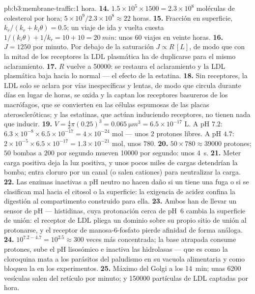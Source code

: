 \begin{solution}{pb:b3:membrane-traffic:1}
hora.
\textbf{14.} $1.5\times 10^{5}\times 1500 = 2.3\times 10^{8}$ moléculas
de colesterol por hora; $5\times 10^{9}/2.3\times 10^{8} \approx 22$
horas.
\textbf{15.} Fracción en superficie, $k_{r}/(k_{r} + k_{i}\theta) = 0.5$;
un viaje de ida y vuelta cuesta
$1/(k_{i}\theta) + 1/k_{r} = 10 + 10 = \qty{20}{min}$: unos $60$ viajes
en veinte horas.
\textbf{16.} $J = 1250$ por minuto. Por debajo de la saturación
$J \propto R\,[L]$, de modo que con la mitad de los receptores la LDL
plasmática ha de duplicarse para el mismo aclaramiento.
\textbf{17.} $R$ vuelve a \num{50000}: se restaura el aclaramiento y la
LDL plasmática baja hacia lo normal --- el efecto de la estatina.
\textbf{18.} Sin receptores, la LDL solo se aclara por vías inespecíficas
y lentas, de modo que circula durante días en lugar de horas, se oxida y
la captan los receptores basureros de los macrófagos, que se convierten
en las células espumosas de las placas ateroscleróticas; y las estatinas,
que actúan induciendo receptores, no tienen nada que inducir.
\textbf{19.} $V = \tfrac{4}{3}\pi(0.25)^{3} = \qty{0.065}{\micro m^3} =
6.5\times 10^{-17}$ L. A pH $7.2$: $6.3\times 10^{-8}\times 6.5\times
10^{-17} = 4\times 10^{-24}$ mol --- unos $2$ protones libres. A pH
$4.7$: $2\times 10^{-5}\times 6.5\times 10^{-17} = 1.3\times 10^{-21}$
mol, unos $780$.
\textbf{20.} $50\times 780 \approx \num{39000}$ protones; $50$ bombas a
$200$ por segundo mueven \num{10000} por segundo: unos \qty{4}{s}.
\textbf{21.} Meter carga positiva deja la luz positiva, y unos pocos
miles de cargas detendrían la bomba; entra cloruro por un canal (o salen
cationes) para neutralizar la carga.
\textbf{22.} Las enzimas inactivas a pH neutro no hacen daño si un
 tiene una fuga o si se clasifican mal hacia el citosol o la
superficie: la exigencia de acidez confina la digestión al compartimento
construido para ella.
\textbf{23.} Ambos han de llevar un sensor de pH --- histidinas, cuya
protonación cerca de pH~6 cambia la superficie de unión: el receptor de
LDL pliega un dominio sobre su propio sitio de unión al protonarse, y el
receptor de manosa-6-fosfato pierde afinidad de forma análoga.
\textbf{24.} $10^{7.2 - 4.7} = 10^{2.5} \approx 300$ veces más
concentrada; la base atrapada consume protones, sube el pH lisosómico e
inactiva las hidrolasas --- que es como la cloroquina mata a los
parásitos del paludismo en su vacuola alimentaria y como bloquea la
 en los experimentos.
\textbf{25.} Máximo del Golgi a los \qty{14}{min}; unas \num{6200}
vesículas salen del retículo por minuto; y \num{150000} partículas de LDL
captadas por hora.
\end{solution}
